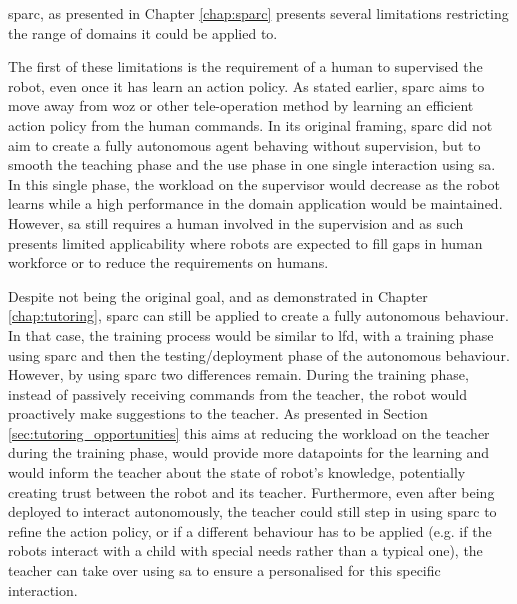 \gls{sparc}, as presented in Chapter \ref{chap:sparc} presents several limitations restricting the range of domains it could be applied to.

The first of these limitations is the requirement of a human to supervised the robot, even once it has learn an action policy. As stated earlier, \gls{sparc} aims to move away from \gls{woz} or other tele-operation method by learning an efficient action policy from the human commands. In its original framing, \gls{sparc} did not aim to create a fully autonomous agent behaving without supervision, but to smooth the teaching phase and the use phase in one single interaction using \gls{sa}. In this single phase, the workload on the supervisor would decrease as the robot learns while a high performance in the domain application would be maintained. However, \gls{sa} still requires a human involved in the supervision and as such presents limited applicability where robots are expected to fill gaps in human workforce or to reduce the requirements on humans. 

Despite not being the original goal, and as demonstrated in Chapter \ref{chap:tutoring}, \gls{sparc} can still be applied to create a fully autonomous behaviour. In that case, the training process would be similar to \gls{lfd}, with a training phase using \gls{sparc} and then the testing/deployment phase of the autonomous behaviour. However, by using \gls{sparc} two differences remain. During the training phase, instead of passively receiving commands from the teacher, the robot would proactively make suggestions to the teacher. As presented in Section \ref{sec:tutoring_opportunities} this aims at reducing the workload on the teacher during the training phase, would provide more datapoints for the learning and would inform the teacher about the state of robot's knowledge, potentially creating trust between the robot and its teacher. Furthermore, even after being deployed to interact autonomously, the teacher could still step in using \gls{sparc} to refine the action policy, or if a different behaviour has to be applied (e.g. if the robots interact with a child with special needs rather than a typical one), the teacher can take over using \gls{sa} to ensure a personalised for this specific interaction.

